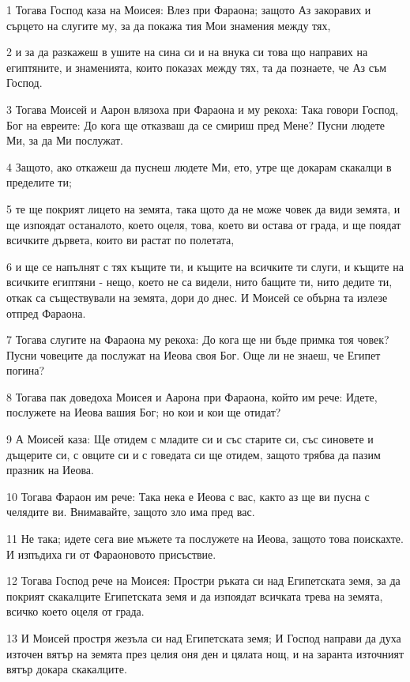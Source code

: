 \par 1 Тогава Господ каза на Моисея: Влез при Фараона; защото Аз закоравих и сърцето на слугите му, за да покажа тия Мои знамения между тях,
\par 2 и за да разкажеш в ушите на сина си и на внука си това що направих на египтяните, и знаменията, които показах между тях, та да познаете, че Аз съм Господ.
\par 3 Тогава Моисей и Аарон влязоха при Фараона и му рекоха: Така говори Господ, Бог на евреите: До кога ще отказваш да се смириш пред Мене? Пусни людете Ми, за да Ми послужат.
\par 4 Защото, ако откажеш да пуснеш людете Ми, ето, утре ще докарам скакалци в пределите ти;
\par 5 те ще покрият лицето на земята, така щото да не може човек да види земята, и ще изпоядат останалото, което оцеля, това, което ви остава от града, и ще поядат всичките дървета, които ви растат по полетата,
\par 6 и ще се напълнят с тях къщите ти, и къщите на всичките ти слуги, и къщите на всичките египтяни - нещо, което не са видели, нито бащите ти, нито дедите ти, откак са съществували на земята, дори до днес. И Моисей се обърна та излезе отпред Фараона.
\par 7 Тогава слугите на Фараона му рекоха: До кога ще ни бъде примка тоя човек? Пусни човеците да послужат на Иеова своя Бог. Още ли не знаеш, че Египет погина?
\par 8 Тогава пак доведоха Моисея и Аарона при Фараона, който им рече: Идете, послужете на Иеова вашия Бог; но кои и кои ще отидат?
\par 9 А Моисей каза: Ще отидем с младите си и със старите си, със синовете и дъщерите си, с овците си и с говедата си ще отидем, защото трябва да пазим празник на Иеова.
\par 10 Тогава Фараон им рече: Така нека е Иеова с вас, както аз ще ви пусна с челядите ви. Внимавайте, защото зло има пред вас.
\par 11 Не така; идете сега вие мъжете та послужете на Иеова, защото това поискахте. И изпъдиха ги от Фараоновото присъствие.
\par 12 Тогава Господ рече на Моисея: Простри ръката си над Египетската земя, за да покрият скакалците Египетската земя и да изпоядат всичката трева на земята, всичко което оцеля от града.
\par 13 И Моисей простря жезъла си над Египетската земя; И Господ направи да духа източен вятър на земята през целия оня ден и цялата нощ, и на заранта източният вятър докара скакалците.
